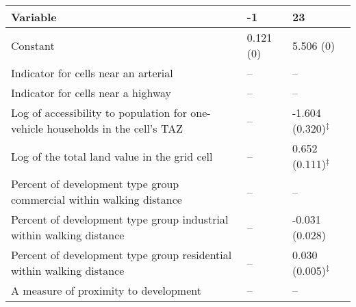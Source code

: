 
\begin{tabular}{p{3in}p{0.5in}p{0.5in}}
\hline\hline
Variable & -1 & 23 \\\hline
Constant & 0.121 (0) & 5.506 (0) \\
Indicator for cells near an arterial & -- & -- \\
Indicator for cells near a highway & -- & -- \\
Log of accessibility to population for one-vehicle households in the cell's TAZ & -- & -1.604 (0.320)$^{\ddagger}$ \\
Log of the total land value in the grid cell & -- & 0.652 (0.111)$^{\ddagger}$ \\
Percent of development type group commercial within walking distance & -- & -- \\
Percent of development type group industrial within walking distance & -- & -0.031 (0.028) \\
Percent of development type group residential within walking distance & -- & 0.030 (0.005)$^{\ddagger}$ \\
A measure of proximity to development & -- & -- \\
\hline\hline
\end{tabular}
